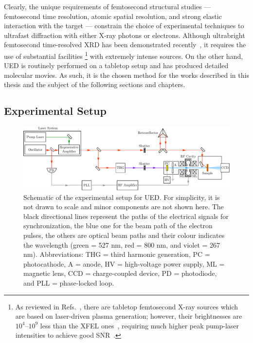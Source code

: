Clearly, the unique requirements of femtosecond structural studies ---
femtosecond time resolution, atomic spatial resolution,
and strong elastic interaction with the target ---
constrain the choice of experimental techniques to
ultrafast diffraction with either X-ray photons or electrons.
%
Although ultrabright femtosecond time-resolved XRD has been demonstrated
recently~\cite{Tenboer2014, Barends2015, Pande2016},
it requires the use of substantial facilities%
\footnote{As reviewed in Refs.~\cite{Rousse2001, Bargheer2006, Chergui2009, Elsaesser2010,
Carbone2012, Hada2013, Elsaesser2014, Young2018},
there are tabletop femtosecond X-ray sources which are based on laser-driven plasma generation;
however, their brightnesses are $10^4$--$10^9$ less than the XFEL ones~\cite{Elsaesser2014},
requiring much higher peak pump-laser intensities to achieve good SNR~\cite{Zamponi2010,
Zamponi2012, Freyer2013}.}
with extremely intense sources.
%
On the other hand, UED is routinely performed on a tabletop setup
and has produced detailed molecular movies.
%
As such, it is the chosen method for the works described in this thesis
and the subject of the following sections and chapters.


\subsection{Experimental Setup}
\label{sec: UED-setup}

\begin{figure}[ht!]
  \centering
  \includegraphics[width = \textwidth]{Figures/fig_ch2_setup-UED.pdf}
  \caption[Schematic of the experimental setup for UED.]{
    Schematic of the experimental setup for UED.
    For simplicity, it is not drawn to scale and minor components are not shown here.
    The black directional lines represent the paths of the electrical signals for
    synchronization, the blue one for the beam path of the electron pulses,
    the others are optical beam paths and their colour indicates the wavelength
    (green = 527 nm, red = 800 nm, and violet = 267 nm).
    Abbreviations: THG = third harmonic generation, PC = photocathode,
    A = anode, HV = high-voltage power supply, ML = magnetic lens, CCD = charge-coupled device,
    PD = photodiode, and PLL = phase-locked loop.
  }
  \label{fig: UED-setup}
\end{figure}

